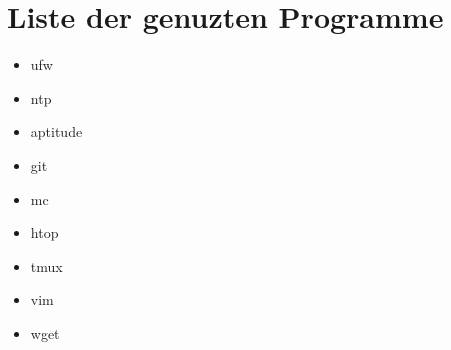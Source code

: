 \chapter{Liste der genuzten Programme}

\begin{itemize}
    \item ufw
    \item ntp
    \item aptitude
    \item git
    \item mc
    \item htop
    \item tmux
    \item vim
    \item wget
\end{itemize} 

